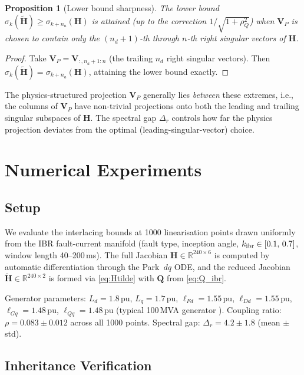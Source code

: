 \documentclass[11pt,a4paper]{article}
\theoremstyle{plain}
\newtheorem{proposition}{Proposition}
\theoremstyle{definition}
\theoremstyle{remark}
\newcommand{\bfH}{\mathbf{H}}
\newcommand{\bfHt}{\tilde{\mathbf{H}}}
\newcommand{\bfQ}{\mathbf{Q}}
\newcommand{\bfV}{\mathbf{V}}
\newcommand{\kibr}{k_{\rm ibr}}
\begin{document}
\begin{proposition}[Lower bound sharpness]
\label{prop:sharp_lower}
The lower bound $\sigma_k(\bfHt) \geq \sigma_{k+n_a}(\bfH)$
is attained (up to the correction $1/\sqrt{1+\rho_Q^2}$) when
$\bfV_P$ is chosen to contain only the $(n_d+1)$-th through $n$-th
right singular vectors of $\bfH$.
\end{proposition}
\begin{proof}
Take $\bfV_P = \bfV_{:,n_a+1:n}$ (the trailing $n_d$ right singular
vectors).  Then $\sigma_k(\bfHt) = \sigma_{k+n_a}(\bfH)$,
attaining the lower bound exactly.
\end{proof}

The physics-structured projection $\bfV_P$ generally lies
\emph{between} these extremes, i.e., the columns of $\bfV_P$
have non-trivial projections onto both the leading and trailing
singular subspaces of $\bfH$.  The spectral gap $\Delta_r$ controls
how far the physics projection deviates from the optimal
(leading-singular-vector) choice.

\section{Numerical Experiments}
\label{sec:application}

\subsection{Setup}

We evaluate the interlacing bounds at 1000 linearisation points
drawn uniformly from the IBR fault-current manifold (fault type,
inception angle, $\kibr \in [0.1,\,0.7]$, window length 40--200\,ms).
The full Jacobian $\bfH \in \mathbb{R}^{240 \times 6}$ is computed
by automatic differentiation through the Park~$dq$ ODE, and the
reduced Jacobian $\bfHt \in \mathbb{R}^{240 \times 2}$ is formed
via \eqref{eq:Htilde} with $\bfQ$ from \eqref{eq:Q_ibr}.

Generator parameters: $L_d = 1.8$\,pu, $L_q = 1.7$\,pu,
$\ell_{Fd} = 1.55$\,pu, $\ell_{Dd} = 1.55$\,pu,
$\ell_{Gq} = 1.48$\,pu, $\ell_{Qq} = 1.48$\,pu
(typical 100\,MVA generator \cite{Kundur1994}).
Coupling ratio: $\rho = 0.083 \pm 0.012$ across all 1000 points.
Spectral gap: $\Delta_r = 4.2 \pm 1.8$ (mean $\pm$ std).

\subsection{Inheritance Verification}
\end{document}
